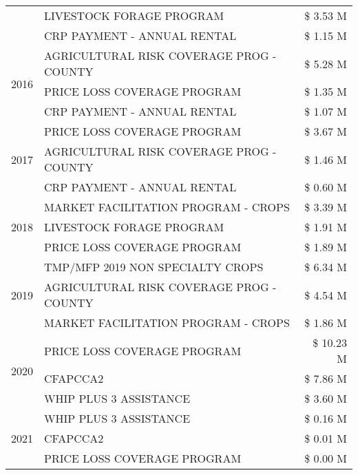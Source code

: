 \begin{tabular}{llr}
 & LIVESTOCK FORAGE PROGRAM & \$ 3.53 M \\
 & CRP PAYMENT - ANNUAL RENTAL & \$ 1.15 M \\
\cline{1-3}
\multirow[t]{3}{*}{2016} & AGRICULTURAL RISK COVERAGE PROG - COUNTY & \$ 5.28 M \\
 & PRICE LOSS COVERAGE PROGRAM & \$ 1.35 M \\
 & CRP PAYMENT - ANNUAL RENTAL & \$ 1.07 M \\
\cline{1-3}
\multirow[t]{3}{*}{2017} & PRICE LOSS COVERAGE PROGRAM & \$ 3.67 M \\
 & AGRICULTURAL RISK COVERAGE PROG - COUNTY & \$ 1.46 M \\
 & CRP PAYMENT - ANNUAL RENTAL & \$ 0.60 M \\
\cline{1-3}
\multirow[t]{3}{*}{2018} & MARKET FACILITATION PROGRAM - CROPS & \$ 3.39 M \\
 & LIVESTOCK FORAGE PROGRAM & \$ 1.91 M \\
 & PRICE LOSS COVERAGE PROGRAM & \$ 1.89 M \\
\cline{1-3}
\multirow[t]{3}{*}{2019} & TMP/MFP 2019 NON SPECIALTY CROPS & \$ 6.34 M \\
 & AGRICULTURAL RISK COVERAGE PROG - COUNTY & \$ 4.54 M \\
 & MARKET FACILITATION PROGRAM - CROPS & \$ 1.86 M \\
\cline{1-3}
\multirow[t]{3}{*}{2020} & PRICE LOSS COVERAGE PROGRAM & \$ 10.23 M \\
 & CFAPCCA2 & \$ 7.86 M \\
 & WHIP PLUS 3 ASSISTANCE & \$ 3.60 M \\
\cline{1-3}
\multirow[t]{3}{*}{2021} & WHIP PLUS 3 ASSISTANCE & \$ 0.16 M \\
 & CFAPCCA2 & \$ 0.01 M \\
 & PRICE LOSS COVERAGE PROGRAM & \$ 0.00 M \\
\cline{1-3}
\bottomrule
\end{tabular}
